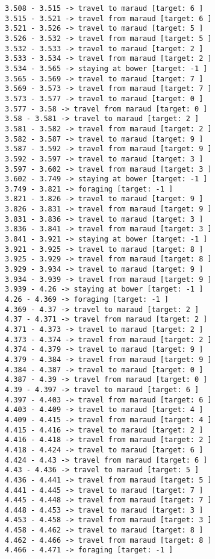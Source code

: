 \documentclass[11pt]{article}
\begin{document}
\begin{Verbatim}[commandchars=\\\{\}]
3.508 - 3.515 -> travel to maraud [target: 6 ]
3.515 - 3.521 -> travel from maraud [target: 6 ]
3.521 - 3.526 -> travel to maraud [target: 5 ]
3.526 - 3.532 -> travel from maraud [target: 5 ]
3.532 - 3.533 -> travel to maraud [target: 2 ]
3.533 - 3.534 -> travel from maraud [target: 2 ]
3.534 - 3.565 -> staying at bower [target: -1 ]
3.565 - 3.569 -> travel to maraud [target: 7 ]
3.569 - 3.573 -> travel from maraud [target: 7 ]
3.573 - 3.577 -> travel to maraud [target: 0 ]
3.577 - 3.58 -> travel from maraud [target: 0 ]
3.58 - 3.581 -> travel to maraud [target: 2 ]
3.581 - 3.582 -> travel from maraud [target: 2 ]
3.582 - 3.587 -> travel to maraud [target: 9 ]
3.587 - 3.592 -> travel from maraud [target: 9 ]
3.592 - 3.597 -> travel to maraud [target: 3 ]
3.597 - 3.602 -> travel from maraud [target: 3 ]
3.602 - 3.749 -> staying at bower [target: -1 ]
3.749 - 3.821 -> foraging [target: -1 ]
3.821 - 3.826 -> travel to maraud [target: 9 ]
3.826 - 3.831 -> travel from maraud [target: 9 ]
3.831 - 3.836 -> travel to maraud [target: 3 ]
3.836 - 3.841 -> travel from maraud [target: 3 ]
3.841 - 3.921 -> staying at bower [target: -1 ]
3.921 - 3.925 -> travel to maraud [target: 8 ]
3.925 - 3.929 -> travel from maraud [target: 8 ]
3.929 - 3.934 -> travel to maraud [target: 9 ]
3.934 - 3.939 -> travel from maraud [target: 9 ]
3.939 - 4.26 -> staying at bower [target: -1 ]
4.26 - 4.369 -> foraging [target: -1 ]
4.369 - 4.37 -> travel to maraud [target: 2 ]
4.37 - 4.371 -> travel from maraud [target: 2 ]
4.371 - 4.373 -> travel to maraud [target: 2 ]
4.373 - 4.374 -> travel from maraud [target: 2 ]
4.374 - 4.379 -> travel to maraud [target: 9 ]
4.379 - 4.384 -> travel from maraud [target: 9 ]
4.384 - 4.387 -> travel to maraud [target: 0 ]
4.387 - 4.39 -> travel from maraud [target: 0 ]
4.39 - 4.397 -> travel to maraud [target: 6 ]
4.397 - 4.403 -> travel from maraud [target: 6 ]
4.403 - 4.409 -> travel to maraud [target: 4 ]
4.409 - 4.415 -> travel from maraud [target: 4 ]
4.415 - 4.416 -> travel to maraud [target: 2 ]
4.416 - 4.418 -> travel from maraud [target: 2 ]
4.418 - 4.424 -> travel to maraud [target: 6 ]
4.424 - 4.43 -> travel from maraud [target: 6 ]
4.43 - 4.436 -> travel to maraud [target: 5 ]
4.436 - 4.441 -> travel from maraud [target: 5 ]
4.441 - 4.445 -> travel to maraud [target: 7 ]
4.445 - 4.448 -> travel from maraud [target: 7 ]
4.448 - 4.453 -> travel to maraud [target: 3 ]
4.453 - 4.458 -> travel from maraud [target: 3 ]
4.458 - 4.462 -> travel to maraud [target: 8 ]
4.462 - 4.466 -> travel from maraud [target: 8 ]
4.466 - 4.471 -> foraging [target: -1 ]

\end{Verbatim}
\end{document}
